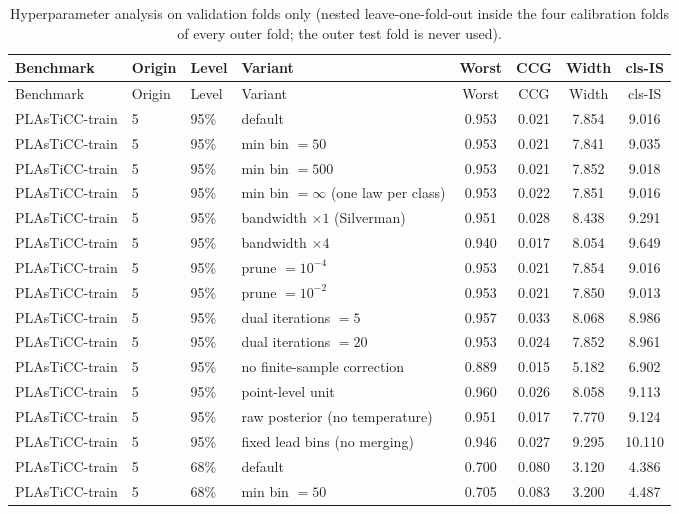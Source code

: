 \begingroup
\scriptsize
\begin{longtable}{lllp{4.2cm}cccc}
\caption{Hyperparameter analysis on validation folds only (nested leave-one-fold-out inside the four calibration folds of every outer fold; the outer test fold is never used).}
\label{tab:hyper}\\
\toprule
Benchmark & Origin & Level & Variant & Worst & CCG & Width & cls-IS \\
\midrule
\endfirsthead
\toprule
Benchmark & Origin & Level & Variant & Worst & CCG & Width & cls-IS \\
\midrule
\endhead
PLAsTiCC-train & 5 & 95\% & default & 0.953 & 0.021 & 7.854 & 9.016 \\
PLAsTiCC-train & 5 & 95\% & min bin $= 50$ & 0.953 & 0.021 & 7.841 & 9.035 \\
PLAsTiCC-train & 5 & 95\% & min bin $= 500$ & 0.953 & 0.021 & 7.852 & 9.018 \\
PLAsTiCC-train & 5 & 95\% & min bin $= \infty$ (one law per class) & 0.953 & 0.022 & 7.851 & 9.016 \\
PLAsTiCC-train & 5 & 95\% & bandwidth $\times 1$ (Silverman) & 0.951 & 0.028 & 8.438 & 9.291 \\
PLAsTiCC-train & 5 & 95\% & bandwidth $\times 4$ & 0.940 & 0.017 & 8.054 & 9.649 \\
PLAsTiCC-train & 5 & 95\% & prune $= 10^{-4}$ & 0.953 & 0.021 & 7.854 & 9.016 \\
PLAsTiCC-train & 5 & 95\% & prune $= 10^{-2}$ & 0.953 & 0.021 & 7.850 & 9.013 \\
PLAsTiCC-train & 5 & 95\% & dual iterations $= 5$ & 0.957 & 0.033 & 8.068 & 8.986 \\
PLAsTiCC-train & 5 & 95\% & dual iterations $= 20$ & 0.953 & 0.024 & 7.852 & 8.961 \\
PLAsTiCC-train & 5 & 95\% & no finite-sample correction & 0.889 & 0.015 & 5.182 & 6.902 \\
PLAsTiCC-train & 5 & 95\% & point-level unit & 0.960 & 0.026 & 8.058 & 9.113 \\
PLAsTiCC-train & 5 & 95\% & raw posterior (no temperature) & 0.951 & 0.017 & 7.770 & 9.124 \\
PLAsTiCC-train & 5 & 95\% & fixed lead bins (no merging) & 0.946 & 0.027 & 9.295 & 10.110 \\
PLAsTiCC-train & 5 & 68\% & default & 0.700 & 0.080 & 3.120 & 4.386 \\
PLAsTiCC-train & 5 & 68\% & min bin $= 50$ & 0.705 & 0.083 & 3.200 & 4.487 \\

\end{longtable}
